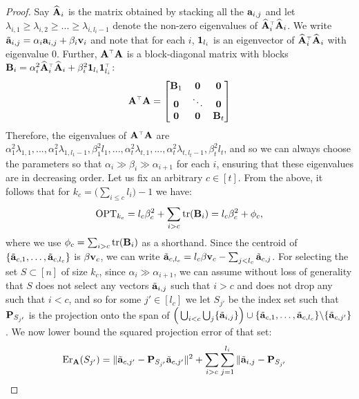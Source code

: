 \documentclass{article}
\begin{document}
\begin{proof}
Say $\Abh_i$ is the matrix obtained
  by stacking all the $\a_{i,j}$ and let $\lambda_{i,1}\geq
  \lambda_{i,2}\geq ...\geq \lambda_{i,l_i-1}$ denote the non-zero eigenvalues of
  $\Abh_i^\top\Abh_i$. We write $\tilde\a_{i,j} = 
  \alpha_i\a_{i,j}+\beta_i \v_i$ and note that for each $i$,
  $\one_{l_i}$ is an eigenvector of $\Abh_i^\top\Abh_i$ with
  eigenvalue $0$. Further, $\A^\top\A$ is a block-diagonal matrix
with blocks $\B_i=\alpha_i^2\Abh_i^\top\Abh_i  + \beta_i^2 \one_{l_i} \one_{l_i}^\top$: 
  \begin{align*}
    \A^\top \A = \begin{bmatrix}
\B_1&\zero
      &\zero\\
      \zero &\ddots &\zero\\
      \zero &\zero &\B_t
      \end{bmatrix}
  \end{align*}
  Therefore, the eigenvalues of $\A^\top\A$ are
  $\alpha_1^2\lambda_{1,1},...,\alpha_1^2\lambda_{1,l_1-1},\beta_1^2l_1,
  ...,
  \alpha_t^2\lambda_{t,1},...,\alpha_t^2\lambda_{t,l_t-1},\beta_t^2l_t$,
  and so we can always choose the parameters so that
  $\alpha_i\gg\beta_i\gg\alpha_{i+1}$ for each $i$, ensuring that
  these eigenvalues are in decreasing order.
Let us fix an arbitrary $c\in[t]$. From the above, it follows that for
$k_c=\big(\sum_{i\leq c}l_i\big)-1$ we have:
  \begin{align*}
  \mathrm{OPT}_{k_c} =l_c\beta_c^2 + \sum_{i>c}\tr(\B_i)=
l_c\beta_c^2 + \phi_c,  
\end{align*}
where we use $\phi_c =\sum_{i>c}\tr(\B_i) $ as a shorthand. 
Since the centroid of $\{\tilde\a_{c,1}, \ldots, \tilde\a_{c,l_c} \}$ is $\beta \v_c$, we can write 
$\tilde\a_{c, l_c} = l_c\beta\v_c - \sum_{j< l_c} \tilde\a_{c,j}$.
For selecting the set $S\subset [n]$ of size $k_c$, since
$\alpha_i\gg\alpha_{i+1}$, we can assume without loss of
generality that $S$ does not select any vectors $\tilde\a_{i,j}$ such
that $i>c$ and does not drop any such that $i<c$, and so for some
$j'\in[l_c]$ we let $S_{j'}$ be the index set such that $\P_{S_{j'}}$ is the
projection onto the span of $\Big(\bigcup_{i<c} \bigcup_j \{\tilde\a_{i,j}\}\Big) \cup
\{\tilde\a_{c,1},\ldots,\tilde\a_{c,l_c}\}\backslash\{\tilde\a_{c,j'}\}$.  We now lower bound the
squared projection error of that set:
\begin{align*}
  \Er_{\A}(S_{j'})
  &= \| \tilde\a_{c,j'}- \P_{S_{j'}} \tilde\a_{c,j'}  \|^2
    +  \sum_{i>c}\sum_{j=1}^{l_i}\| \tilde\a_{i,j} - \P_{S_{j'}}

\end{align*}
\end{proof}
\end{document}
